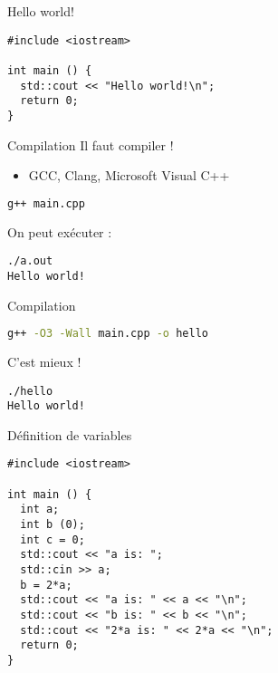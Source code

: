 
\begin{frame}[fragile]{Hello world!}
  \begin{lstlisting}
#include <iostream>

int main () {
  std::cout << "Hello world!\n";
  return 0;
}
  \end{lstlisting}
\end{frame}

\begin{frame}[fragile]{Compilation}
  Il faut compiler !
  \begin{itemize}
    \item GCC, Clang, Microsoft Visual C++
  \end{itemize}

  \begin{lstlisting}[language=bash]
g++ main.cpp
  \end{lstlisting}

  On peut exécuter :
  \begin{lstlisting}
./a.out
Hello world!
  \end{lstlisting}
\end{frame}

\begin{frame}[fragile]{Compilation}
  \begin{lstlisting}[language=bash]
g++ -O3 -Wall main.cpp -o hello
  \end{lstlisting}

  C'est mieux !
  \begin{lstlisting}
./hello
Hello world!
  \end{lstlisting}
\end{frame}

\begin{frame}[fragile]{Définition de variables}
  \begin{lstlisting}
#include <iostream>

int main () {
  int a;
  int b (0);
  int c = 0;
  std::cout << "a is: ";
  std::cin >> a;
  b = 2*a;
  std::cout << "a is: " << a << "\n";
  std::cout << "b is: " << b << "\n";
  std::cout << "2*a is: " << 2*a << "\n";
  return 0;
}
  \end{lstlisting}
\end{frame}

